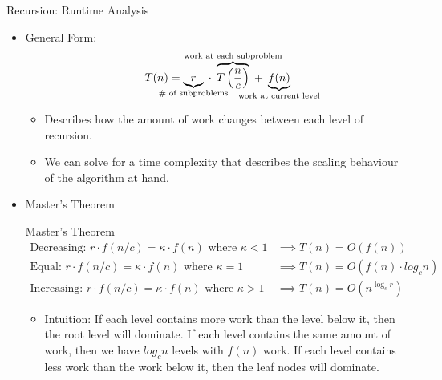 \documentclass{beamer}
\begin{document}
\begin{frame}[t]{Recursion: Runtime Analysis}
  \begin{itemize}
    \item \alert{General Form:} $$T(n) = \underbrace{r}_{\mathclap{\text{\# of subproblems}}} \; \cdot \; 
\overbrace{T\left(\frac{n}{c}\right)}^{\mathclap{\text{work at each subproblem}}} 
\; + \; \underbrace{f(n)}_{\mathclap{\text{work at current level}}}$$
    \begin{itemize}
        \item Describes how the amount of work changes between each level of recursion.
        \item We can solve for a \alert{time complexity} that describes the scaling behaviour of the algorithm at hand.
    \end{itemize}

    \pause
    \item \alert{Master's Theorem}
    \begin{block}{Master's Theorem}
        \begin{align*}
            \text{Decreasing: } r \cdot f(n / c) = \kappa \cdot f(n) \text{ where } \kappa < 1 &\implies T(n) = O(f(n)) \\ 
            \text{Equal: } r \cdot f(n / c) = \kappa \cdot f(n) \text{ where } \kappa = 1 &\implies T(n) = O(f(n)\cdot log_{c}{n}) \\
            \text{Increasing: } r \cdot f(n / c) = \kappa \cdot f(n) \text{ where } \kappa > 1 &\implies T(n) = O(n^{\log_{c}{r}})
        \end{align*}
    \end{block}
    \pause
    \begin{itemize}
        \item \alert{Intuition:} If each level contains more work than the level below it, then the root level will dominate. If each level contains the same amount of work, then we have $log_{c}{n}$ levels with $f(n)$ work. If each level contains less work than the work below it, then the leaf nodes will dominate.
    \end{itemize}
  \end{itemize}
\end{frame}
\end{document}
